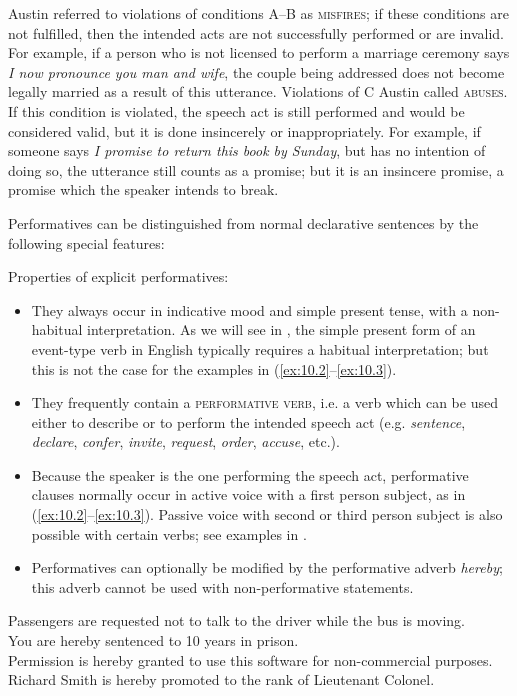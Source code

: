 
Austin referred to violations of conditions A–B as \textsc{misfires}; if these conditions are not fulfilled, then the intended acts are not successfully performed or are invalid. For example, if a person who is not licensed to perform a marriage ceremony says \textit{I now pronounce you man and wife}, the couple being addressed does not become legally married as a result of this utterance. Violations of C Austin called \textsc{abuses}. If this condition is violated, the speech act is still performed and would be considered valid, but it is done insincerely or inappropriately. For example, if someone says \textit{I promise to return this book by Sunday}, but has no intention of doing so, the utterance still counts as a promise; but it is an insincere promise, a promise which the speaker intends to break.


Performatives can be distinguished from normal declarative sentences by the following special features:


\ea \label{ex:10.5}
Properties of explicit performatives:
\begin{itemize}
\item They always occur in indicative mood and simple present tense, with a non-habitual interpretation. As we will see in , the simple present form of an event-type verb in English typically requires a habitual interpretation; but this is not the case for the examples in (\ref{ex:10.2}--\ref{ex:10.3}).
\item They frequently contain a \textsc{performative verb}, i.e. a verb which can be used either to describe or to perform the intended speech act (e.g. \textit{sentence}, \textit{declare}, \textit{confer}, \textit{invite}, \textit{request}, \textit{order}, \textit{accuse}, etc.).
\item Because the speaker is the one performing the speech act, performative clauses normally occur in active voice with a first person subject, as in (\ref{ex:10.2}--\ref{ex:10.3}). Passive voice with second or third person subject is also possible with certain verbs; see examples in .
\item Performatives can optionally be modified by the performative adverb \textit{hereby}; this adverb cannot be used with non-performative statements.
\end{itemize}
\z

\ea \label{ex:10.6}
\ea  Passengers are requested not to talk to the driver while the bus is moving.\\
\ex You are hereby sentenced to 10 years in prison.\\
\ex Permission is hereby granted to use this software for non-commercial purposes.\\
\ex Richard Smith is hereby promoted to the rank of Lieutenant Colonel.
                       \z
\z


